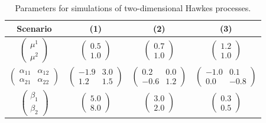     \begin{table}[h!]
    \begin{center}  
        \centering
        \begin{tabular}{c|c|c|c}

             Scenario & (1) & (2) & (3) \\
             \toprule
             $\begin{pmatrix}
            \mu^1\\
            \mu^2
            \end{pmatrix}$ & $\begin{pmatrix}
            0.5\\
            1.0
            \end{pmatrix}$ & $\begin{pmatrix}
            0.7\\
            1.0
            \end{pmatrix}$&$\begin{pmatrix}
            1.2\\
            1.0
            \end{pmatrix}$\\\midrule
            $\begin{pmatrix}
            \alpha_{11} & \alpha_{12}\\
            \alpha_{21} & \alpha_{22}
            \end{pmatrix}$&$\begin{pmatrix}
            -1.9 & 3.0\\
            1.2 & 1.5
            \end{pmatrix}$&$\begin{pmatrix}
            0.2 & 0.0\\
            -0.6 & 1.2
            \end{pmatrix}$&$\begin{pmatrix}
            -1.0 & 0.1\\
            0.0 & -0.8
            \end{pmatrix}$\\\midrule
            $\begin{pmatrix}
            \beta_1\\
            \beta_2
            \end{pmatrix}$ & $\begin{pmatrix}
            5.0\\
            8.0
            \end{pmatrix}$ & $\begin{pmatrix}
            3.0\\
            2.0
            \end{pmatrix}$&$\begin{pmatrix}
            0.3\\
            0.5
            \end{pmatrix}$
        \end{tabular}
        \caption{Parameters for simulations of two-dimensional Hawkes processes.}
        \label{tab:chap3_simulated_2_table}
    \end{center}
    \end{table}

